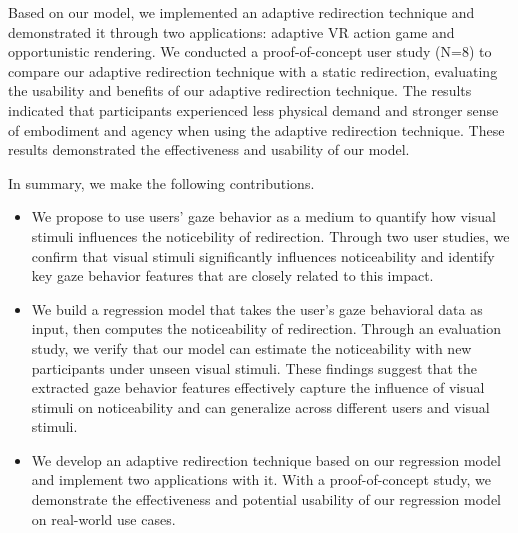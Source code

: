 Based on our model, we implemented an adaptive redirection technique and demonstrated it through two applications: adaptive VR action game and opportunistic rendering.
We conducted a proof-of-concept user study (N=8) to compare our adaptive redirection technique with a static redirection, evaluating the usability and benefits of our adaptive redirection technique.
The results indicated that participants experienced less physical demand and stronger sense of embodiment and agency when using the adaptive redirection technique. 
These results demonstrated the effectiveness and usability of our model.

In summary, we make the following contributions.
% 
\begin{itemize}
    \item 
    We propose to use users' gaze behavior as a medium to quantify how visual stimuli influences the noticebility of redirection. 
    Through two user studies, we confirm that visual stimuli significantly influences noticeability and identify key gaze behavior features that are closely related to this impact.
    \item 
    We build a regression model that takes the user's gaze behavioral data as input, then computes the noticeability of redirection.
    Through an evaluation study, we verify that our model can estimate the noticeability with new participants under unseen visual stimuli.
    These findings suggest that the extracted gaze behavior features effectively capture the influence of visual stimuli on noticeability and can generalize across different users and visual stimuli.
    \item 
    We develop an adaptive redirection technique based on our regression model and implement two applications with it.
    With a proof-of-concept study, we demonstrate the effectiveness and potential usability of our regression model on real-world use cases.

\end{itemize}

